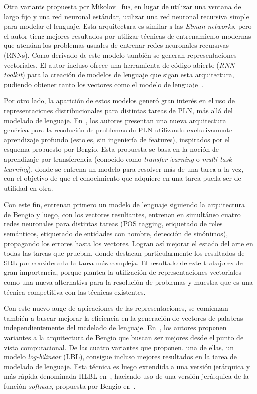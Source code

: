 Otra variante propuesta por Mikolov~\cite{Mikolov2010, Mikolov2011a, Mikolov2011b, Mikolov2011c}
fue, en lugar de utilizar una ventana de largo fijo y una red neuronal estándar, utilizar una red
neuronal recursiva simple para modelar el lenguaje. Esta arquitectura es similar a las \textit{Elman
networks}, pero el autor tiene mejores resultados por utilizar técnicas de entrenamiento modernas
que atenúan los problemas usuales de entrenar redes neuronales recursivas (RNNs). Como derivado de
este modelo también se generan representaciones vectoriales. El autor incluso ofrece una herramienta
de código abierto (\textit{RNN toolkit}) para la creación de modelos de lenguaje que sigan esta
arquitectura, pudiendo obtener tanto los vectores como el modelo de lenguaje~\cite{Mikolov2011c}.


Por otro lado, la aparición de estos modelos generó gran interés en el uso de representaciones
distribucionales para distintas tareas de PLN, más allá del modelado de
lenguaje. En~\cite{CollobertWeston2008}, los autores presentan una nueva arquitectura genérica para
la resolución de problemas de PLN utilizando exclusivamente aprendizaje profundo (esto es, sin
ingeniería de features), inspirados por el esquema propuesto por Bengio. Esta propuesta se basa en
la noción de aprendizaje por transferencia (conocido como \textit{transfer learning} o
\textit{multi-task learning}), donde se entrena un modelo para resolver más de una tarea a la vez,
con el objetivo de que el conocimiento que adquiere en una tarea pueda ser de utilidad en otra.

Con este fin, entrenan primero un modelo de lenguaje siguiendo la arquitectura de Bengio y luego,
con los vectores resultantes, entrenan en simultáneo cuatro redes neuronales para distintas tareas
(POS tagging, etiquetado de roles semánticos, etiquetado de entidades con nombre, detección de
sinónimos), propagando los errores hasta los vectores. Logran así mejorar el estado del arte en
todas las tareas que prueban, donde destacan particularmente los resultados de SRL por considerarla
la tarea más compleja. El resultado de este trabajo es de gran importancia, porque plantea la
utilización de representaciones vectoriales como una nueva alternativa para la resolución de
problemas y muestra que es una técnica competitiva con las técnicas existentes.


Con este nuevo auge de aplicaciones de las representaciones, se comienzan también a buscar mejorar
la eficiencia en la generación de vectores de palabras independientemente del modelado de
lenguaje. En~\cite{MnihHinton2007}, los autores proponen variantes a la arquitectura de Bengio que
buscan ser mejores desde el punto de vista computacional. De las cuatro variantes que proponen, una
de ellas, un modelo \textit{log-bilinear} (LBL), consigue incluso mejores resultados en la tarea de
modelado de lenguaje. Esta técnica es luego extendida a una versión jerárquica y más rápida
denominada HLBL en~\cite{MnihHinton2009}, haciendo uso de una versión jerárquica de la función
\textit{softmax}, propuesta por Bengio en~\cite{MorinBengio2005}.


